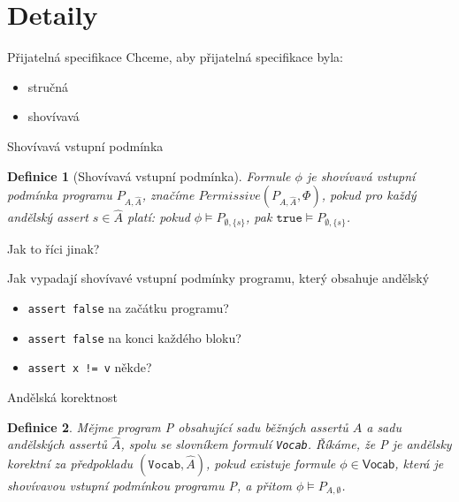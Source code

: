 \documentclass[11pt]{beamer}
\newtheorem{dfn}{Definice}
\begin{document}
\section{Detaily}


\begin{frame}{Přijatelná specifikace}
Chceme, aby přijatelná specifikace byla:
\begin{itemize}
\item stručná
\item shovívavá
\end{itemize}
\end{frame}

\begin{frame}{Shovívavá vstupní podmínka}
\begin{dfn}[Shovívavá vstupní podmínka]
Formule $\phi$ je shovívavá vstupní podmínka programu $P_{A, \hat{A}}$,
značíme $Permissive\left( P_{A, \hat{A}}, \Phi \right)$,
pokud pro každý andělský assert $s \in \hat{A} $ platí:
pokud $\phi \vDash P_{\emptyset, \{ s \} }$, pak  $ \texttt{true} \vDash P_{\emptyset, \{ s \} } $.
\end{dfn}

\pause Jak to říci jinak?

\pause Jak vypadají shovívavé vstupní podmínky programu, který obsahuje andělský
\begin{itemize}
\pause \item \lstinline|assert false| na začátku programu?
\pause \item \lstinline|assert false| na konci každého bloku?
\pause \item \lstinline|assert x != v| někde?
\end{itemize}

\end{frame}

\begin{frame}{Andělská korektnost}
\begin{dfn}
Mějme program P obsahující sadu běžných assertů $A$
a sadu andělských assertů $\hat{A}$, spolu se slovníkem formulí \texttt{Vocab}.
Říkáme, že P je andělsky korektní za předpokladu $( \texttt{Vocab}, \hat{A} )$,
pokud existuje formule $\phi \in \textsf{Vocab}$, která je shovívavou vstupní podmínkou programu P,
a přitom $\phi \vDash P_{A, \emptyset}$. 
\end{dfn}
\end{frame}


\end{document}
